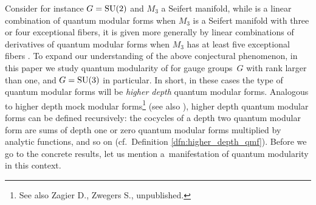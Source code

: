 \documentclass[pdftex]{sigma}
\def\bv{{\vec{\underline{b}}}}
\theoremstyle{definition}
\numberwithin{equation}{section}
\begin{document}
Consider for instance $G={\rm SU}(2)$ and $M_3$ a Seifert manifold, while \smash{$\widehat Z^G_\bv(M_3)$} is a linear combination of quantum modular forms when $M_3$ is a Seifert manifold with three or four exceptional fibers, it is given more generally by linear combinations of derivatives of quantum modular forms when $M_3$ has at least five exceptional fibers \cite{bringmann2019quantum}. To expand our understanding of the above conjectural phenomenon, in this paper we study quantum modularity of \smash{$\widehat Z^G_\bv(M_3)$} for gauge groups~$G$ with rank larger than one, and $G={\rm SU}(3)$ in particular. In short, in these cases the type of quantum modular forms will be {\it higher depth} quantum modular forms. Analogous to higher depth mock modular forms\footnote{See also Zagier D., Zwegers S., {u}npublished.} (see also \cite{Alexandrov:2020dyy,Alexandrov:2020bwg,Alexandrov:2016enp,Alexandrov:2018lgp, bringmann2019vectorvalued, bringmann2016indefinite,Bringmann:2018cov, KumarGupta:2018rac, males2021higher,Manschot:2017xcr}), higher depth quantum modular forms can be defined recursively: the cocycles of a depth two quantum modular form are sums of depth one or zero quantum modular forms multiplied by analytic functions, and so on (cf.\ Definition \ref{dfn:higher_depth_qmf}). Before we go to the concrete results, let us mention a~manifestation of quantum modularity in this context.
\end{document}
